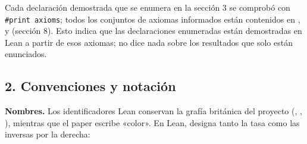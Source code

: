 \documentclass[spanish,11pt,a4paper]{article}
\begin{document}
Cada declaración demostrada que se enumera en la sección 3 se comprobó con \texttt{\#print\ axioms}; todos los conjuntos de axiomas informados están contenidos en ,  y  (sección 8). Esto indica que las declaraciones enumeradas están demostradas en Lean a partir de esos axiomas; no dice nada sobre los resultados que solo están enunciados.

\subsection{2. Convenciones y notación}\label{convenciones-y-notaciuxf3n}

\textbf{Nombres.} Los identificadores Lean conservan la grafía británica del proyecto (, , ), mientras que el paper escribe «color». En Lean,  designa tanto la tasa como las inversas por la derecha:
\end{document}
